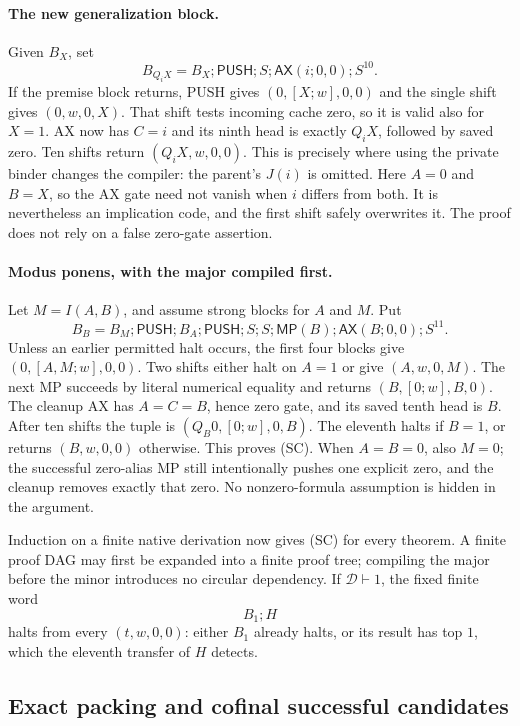 \paragraph{The new generalization block.}
Given $B_X$, set
\[
 B_{Q_iX}=B_X;\mathsf{PUSH};S;\mathsf{AX}(i;0,0);S^{10}.
 \tag{GEN-C}
\]
If the premise block returns, PUSH gives $(0,[X;w],0,0)$ and the single
shift gives $(0,w,0,X)$.  That shift tests incoming cache zero, so it is
valid also for $X=1$.  AX now has $C=i$ and its ninth head is exactly
$Q_iX$, followed by saved zero.  Ten shifts return $(Q_iX,w,0,0)$.
This is precisely where using the private binder changes the compiler:
the parent's $J(i)$ is omitted.  Here $A=0$ and $B=X$, so the AX gate
need not vanish when $i$ differs from both.  It is nevertheless an
implication code, and the first shift safely overwrites it.  The proof
does not rely on a false zero-gate assertion.

\paragraph{Modus ponens, with the major compiled first.}
Let $M=I(A,B)$, and assume strong blocks for $A$ and $M$.  Put
\[
 B_B=B_M;\mathsf{PUSH};B_A;\mathsf{PUSH};S;S;
       \mathsf{MP}(B);\mathsf{AX}(B;0,0);S^{11}.
 \tag{MP-C}
\]
Unless an earlier permitted halt occurs, the first four blocks give
$(0,[A,M;w],0,0)$.  Two shifts either halt on $A=1$ or give
$(A,w,0,M)$.  The next MP succeeds by literal numerical equality and
returns $(B,[0;w],B,0)$.  The cleanup AX has $A=C=B$, hence zero
gate, and its saved tenth head is $B$.  After ten shifts the tuple is
$(Q_B0,[0;w],0,B)$.  The eleventh halts if $B=1$, or returns
$(B,w,0,0)$ otherwise.  This proves (SC).  When $A=B=0$, also $M=0$;
the successful zero-alias MP still intentionally pushes one explicit
zero, and the cleanup removes exactly that zero.  No nonzero-formula
assumption is hidden in the argument.

Induction on a finite native derivation now gives (SC) for every theorem.
A finite proof DAG may first be expanded into a finite proof tree;
compiling the major before the minor introduces no circular dependency.
If $\mathcal D\vdash1$, the fixed finite word
\[
                         B_1;H
\]
halts from every $(t,w,0,0)$: either $B_1$ already halts, or its result
has top $1$, which the eleventh transfer of $H$ detects.

\subsection{Exact packing and cofinal successful candidates}


